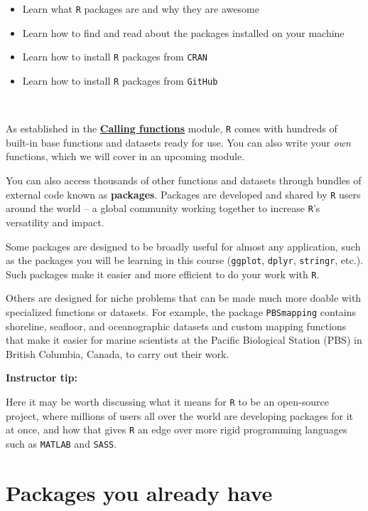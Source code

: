 \documentclass[]{book}
\providecommand{\tightlist}{%
  \setlength{\itemsep}{0pt}\setlength{\parskip}{0pt}}
\begin{document}
\begin{itemize}
\tightlist
\item
  Learn what \texttt{R} packages are and why they are awesome
\item
  Learn how to find and read about the packages installed on your machine
\item
  Learn how to install \texttt{R} packages from \texttt{CRAN}
\item
  Learn how to install \texttt{R} packages from \texttt{GitHub}
\end{itemize}

~

As established in the \protect\hyperlink{calling_functions}{\textbf{Calling functions}} module, \texttt{R} comes with hundreds of built-in base functions and datasets ready for use. You can also write your \emph{own} functions, which we will cover in an upcoming module.

You can also access thousands of other functions and datasets through bundles of external code known as \textbf{packages}. Packages are developed and shared by \texttt{R} users around the world -- a global community working together to increase \texttt{R}'s versatility and impact.

Some packages are designed to be broadly useful for almost any application, such as the packages you will be learning in this course (\texttt{ggplot}, \texttt{dplyr}, \texttt{stringr}, etc.). Such packages make it easier and more efficient to do your work with \texttt{R}.

Others are designed for niche problems that can be made much more doable with specialized functions or datasets. For example, the package \texttt{PBSmapping} contains shoreline, seafloor, and oceanographic datasets and custom mapping functions that make it easier for marine scientists at the Pacific Biological Station (PBS) in British Columbia, Canada, to carry out their work.

\leavevmode\hypertarget{tip-text}{}%
\textbf{Instructor tip:}

Here it may be worth discussing what it means for \texttt{R} to be an open-source project, where millions of users all over the world are developing packages for it at once, and how that gives \texttt{R} an edge over more rigid programming languages such as \texttt{MATLAB} and \texttt{SASS}.

\hypertarget{packages-you-already-have}{%
\section*{Packages you already have}\label{packages-you-already-have}}
\end{document}
